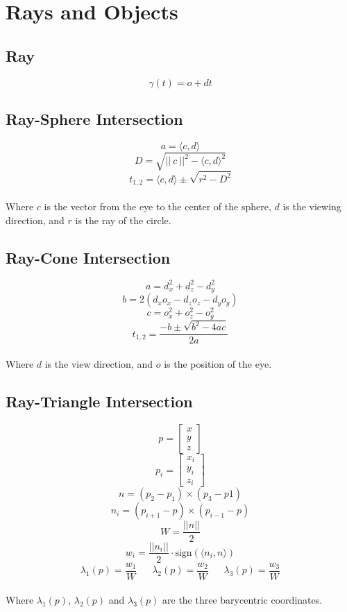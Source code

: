 \documentclass{article}
\begin{document}
\section{Rays and Objects}
\subsection{Ray}
\vspace{.3cm}
\[ \gamma(t) = o + dt \]

\subsection{Ray-Sphere Intersection}
\vspace{.3cm}
\[ a = \langle c, d \rangle \]
\[ D = \sqrt{||~c~||^2 - \langle c, d \rangle^2} \]
\[ t_{1,2} = \langle c, d \rangle \pm \sqrt{r^2 - D^2} \] \\
Where $c$ is the vector from the eye to the center of the sphere, $d$ is the viewing direction, and $r$ is the ray of the circle.

\subsection{Ray-Cone Intersection}
\vspace{.3cm}
\[ a = d_x^2 + d_z^2 - d_y^2 \]
\[ b = 2(d_xo_x - d_zo_z - d_yo_y) \]
\[ c = o_x^2 + o_z^2 - o_y^2 \]
\[ t_{1,2} = \frac{-b \pm \sqrt{b^2 - 4ac}}{2a} \] \\
Where $d$ is the view direction, and $o$ is the position of the eye.

\subsection{Ray-Triangle Intersection}
\vspace{.3cm}
\[ p = \begin{bmatrix} x \\ y \\ z \end{bmatrix} \]
\[ p_i = \begin{bmatrix} x_i \\ y_i \\ z_i \end{bmatrix} \]
\[ n = (p_2 - p_1) \times (p_3 - p1) \]
\[ n_i = (p_{i+1} - p) \times (p_{i-1} - p) \]
\[ W = \frac{||n||}{2} \]
\[ w_i = \frac{||n_i||}{2} \cdot \text{sign}(\langle n_i, n \rangle) \]
\[ \lambda_1(p) = \frac{w_1}{W} ~~~~~~~ \lambda_2(p) = \frac{w_2}{W} ~~~~~~~ \lambda_3(p) = \frac{w_3}{W} \] \\
Where $\lambda_1(p)$, $\lambda_2(p)$ and $\lambda_3(p)$ are the three barycentric coordinates.
\end{document}
